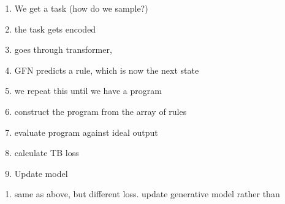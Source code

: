 \begin{enumerate}
    \item We get a task (how do we sample?)
    \item the task gets encoded
    \item goes through transformer, 
    \item GFN predicts a rule, which is now the next state
    \item we repeat this until we have a program
    \item construct the program from the array of rules
    \item evaluate program against ideal output
    \item calculate TB loss
    \item Update model
\end{enumerate}
\begin{enumerate}
    \item same as above, but different loss. update generative model rather than 
\end{enumerate}


